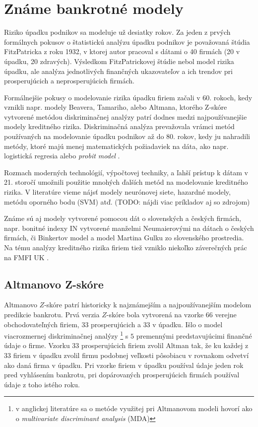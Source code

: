 \section{Známe bankrotné modely}

Riziko úpadku podnikov sa modeluje už desiatky rokov.
Za jeden z prvých formálnych pokusov o štatistickú analýzu úpadku podnikov je považovaná štúdia FitzPatricka z roku 1932,
v ktorej autor pracoval s dátami o 40 firmách (20 v úpadku, 20 zdravých).
Výsledkom FitzPatrickovej štúdie nebol model rizika úpadku, ale analýza jednotlivých finančných ukazovateľov a ich trendov pri prosperujúcich a neprosperujúcich firmách.

Formálnejšie pokusy o modelovanie rizika úpadku firiem začali v 60. rokoch, kedy vznikli napr. modely Beavera, Tamariho, alebo Altmana,
ktorého Z-skóre vytvorené metódou diskriminačnej analýzy patrí dodnes medzi najpoužívanejšie modely kreditného rizika.
Diskriminačná analýza prevažovala vrámci metód používaných na modelovanie úpadku podnikov až do 80. rokov, kedy ju nahradili metódy,
ktoré majú menej matematických požiadaviek na dáta, ako napr. logistická regresia alebo \emph{probit model} \cite{gruszczynski}.

Rozmach moderných technológií, výpočtovej techniky, a ľahší prístup k dátam v 21. storočí umožnili použitie mnohých ďalších metód na modelovanie kreditného rizika.
V literatúre vieme nájsť modely neurónovej siete, hazardné modely, metódu oporného bodu (SVM) atď. (TODO: nájdi viac príkladov aj so zdrojom)

Známe sú aj modely vytvorené pomocou dát o slovenských a českých firmách, napr. bonitné indexy IN vytvorené manželmi Neumaierovými na dátach o českých firmách,
či Binkertov model a model Martina Gulku zo slovenského prostredia. Na tému analýzy kreditného rizika firiem tiež vzniklo niekoľko záverečných prác na FMFI UK \cite{ondrusekova, bohdal}.

\subsection{Altmanovo Z-skóre}

Altmanovo \(Z\)-skóre patrí historicky k najznámejším a najpoužívanejším modelom predikcie bankrotu.
Prvá verzia \(Z\)-skóre bola vytvorená na vzorke \(66\) verejne obchodovateľných firiem, \(33\) prosperujúcich a \(33\) v úpadku\cite{altman1968}.
Išlo o model viacrozmernej diskriminačnej analýzy
\footnote{v anglickej literatúre sa o metóde využitej pri Altmanovom modeli hovorí ako o \emph{multivariate discriminant analysis} (MDA)}
s \(5\) premennými predstavujúcimi finančné údaje o firme.
Vzorku 33 prosperujúcich firiem zvolil Altman tak, že ku každej z \(33\) firiem v úpadku zvolil firmu podobnej veľkosti pôsobiacu v rovnakom odvetví ako daná firma v úpadku.
Pri vzorke firiem v úpadku používal údaje jeden rok pred vyhlásením bankrotu, pri dopárovaných prosperujúcich firmách používal údaje z toho istého roku.

